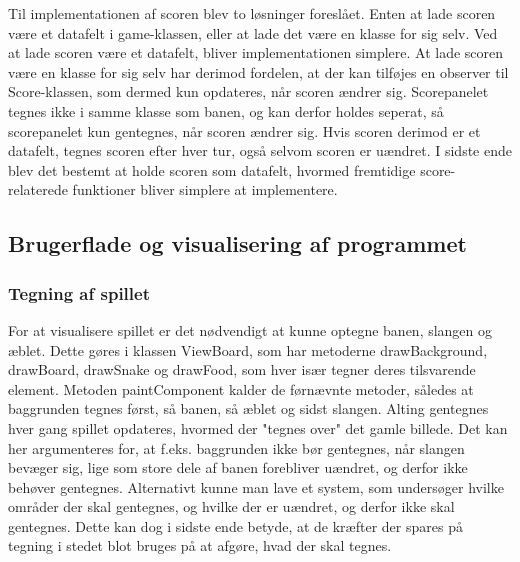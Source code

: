 Til implementationen af scoren blev to løsninger foreslået. Enten at lade scoren være et datafelt i game-klassen, eller at lade det være en klasse for sig selv. Ved at lade scoren være et datafelt, bliver implementationen simplere. At lade scoren være en klasse for sig selv har derimod fordelen, at der kan 
tilføjes en observer til Score-klassen, som dermed kun opdateres, når scoren ændrer sig. Scorepanelet tegnes ikke i samme klasse som banen, og kan derfor holdes seperat, så scorepanelet kun gentegnes, når scoren ændrer sig. Hvis scoren derimod er et datafelt, tegnes scoren efter hver tur, også selvom scoren er uændret. I sidste ende blev det bestemt at holde scoren som datafelt, hvormed fremtidige score-relaterede funktioner bliver simplere at implementere.

\subsection{Brugerflade og visualisering af programmet}
\subsubsection{Tegning af spillet}
For at visualisere spillet er det nødvendigt at kunne optegne banen, slangen og æblet. Dette gøres i klassen ViewBoard, som har metoderne drawBackground, drawBoard, drawSnake og drawFood, som hver især tegner deres tilsvarende element. Metoden paintComponent kalder de førnævnte metoder, således at baggrunden tegnes først, så banen, så æblet og sidst slangen. Alting gentegnes hver gang spillet opdateres, hvormed der "tegnes over" det gamle billede. Det kan her argumenteres for, at f.eks. baggrunden ikke bør gentegnes, når slangen bevæger sig, lige som store dele af banen forebliver uændret, og derfor ikke behøver gentegnes. Alternativt kunne man lave et system, som undersøger hvilke områder der skal gentegnes, og hvilke der er uændret, og derfor ikke skal gentegnes. Dette kan dog i sidste ende betyde, at de kræfter der spares på tegning i stedet blot bruges på at afgøre, hvad der skal tegnes.

